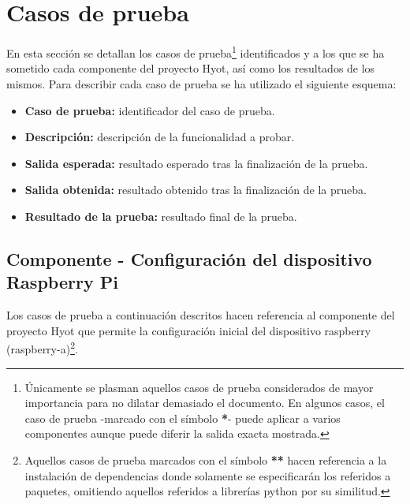 \documentclass[12pt,a4paper, twoside]{report}
\begin{document}
	\section{Casos de prueba}
	
	En esta sección se detallan los casos de prueba\footnote{Únicamente se plasman aquellos casos de prueba considerados de mayor importancia para no dilatar demasiado el documento. En algunos casos, el caso de prueba -marcado con el símbolo \textbf{\color{black!40!blue}*}- puede aplicar a varios componentes aunque puede diferir la salida exacta mostrada.} identificados y a los que se ha sometido cada componente del proyecto Hyot, así como los resultados de los mismos. Para describir cada caso de prueba se ha utilizado el siguiente esquema:
	
	\begin{itemize}
		\item \textbf{Caso de prueba:} identificador del caso de prueba.
		\item \textbf{Descripción:} descripción de la funcionalidad a probar.
		\item \textbf{Salida esperada:} resultado esperado tras la finalización de la prueba.
		\item \textbf{Salida obtenida:} resultado obtenido tras la finalización de la prueba.
		\item \textbf{Resultado de la prueba:} resultado final de la prueba.
	\end{itemize}
	
	\subsection{Componente - Configuración del dispositivo Raspberry Pi}
	
	Los casos de prueba a continuación descritos hacen referencia al componente del proyecto Hyot que permite la configuración inicial del dispositivo \gls{raspberry} (\gls{raspberry-a})\footnote{Aquellos casos de prueba marcados con el símbolo \textbf{\color{black!40!blue}**} hacen referencia a la instalación de dependencias donde solamente se especificarán los referidos a paquetes, omitiendo aquellos referidos a librerías \gls{python} por su similitud.}.
	
	\newpage
	
\end{document}
